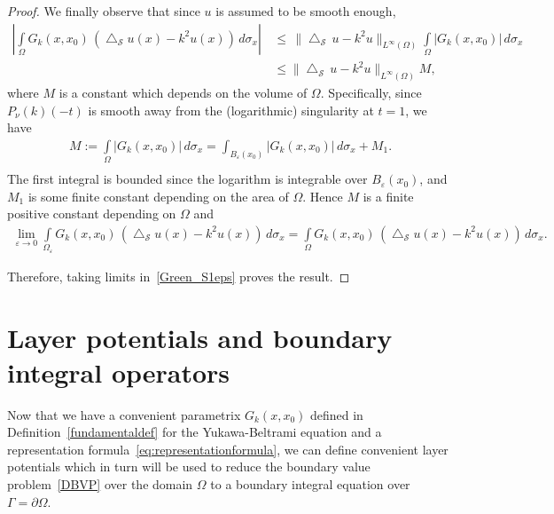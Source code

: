 \documentclass[final]{siamltex}
\newcommand{\lap}{\bigtriangleup}
\renewcommand{\S} {\mathcal{S}}
\begin{document}
\begin{proof}
We finally observe that since $u$ is assumed to be smooth enough,
\begin{align*} 
\left| \int\limits_{\Omega}
G_k(x,x_0)\,(\lap_{\S} u(x)-k^2u(x)) \, d\sigma_x\right|\,&\leq \,
\|\lap_{\S}\,u -k^2 u\|_{L^{\infty}(\Omega)} \int\limits_{\Omega}
|G_k(x,x_0)| \, d\sigma_x\,\\
& \leq \|\lap_{\S}\,u -k^2 u\|_{L^{\infty}(\Omega)}M,
\end{align*}
where $M$ is a constant which depends on the volume of $\Omega$.
Specifically, since $P_\nu(k)(-t)$ is smooth away from the
(logarithmic) singularity at $t=1$, we have 
\begin{align*}
M:=\int\limits_{\Omega} |G_k(x,x_0)| \, d\sigma_x=\int_{B_{\varepsilon}(x_0)}|G_k(x,x_0)| \, d\sigma_x + M_1. \\
\end{align*}
The first integral is bounded since the logarithm is integrable over
${B_{\varepsilon}(x_0)}$, and $M_1$ is some finite constant depending
on the area of $\Omega$. Hence $M$ is a finite positive
constant depending on $\Omega$ and
\begin{align*}
  \lim_{\varepsilon\rightarrow 0}
  \int\limits_{\Omega_{\varepsilon}} G_k(x,x_0)\,(\lap_{\S} u(x)
  -k^2u(x)) \,d\sigma_x = \int\limits_{\Omega} G_k(x,x_0)\,
  (\lap_{\S} u(x) -k^2u(x))\,d\sigma_x.
\end{align*}

Therefore, taking limits in~\eqref{Green_S1eps} proves the result.
\end{proof}

\section{Layer potentials and boundary integral operators}
Now that we have a convenient parametrix $G_k(x,x_0)$ defined in
Definition~\ref{fundamentaldef} for the Yukawa-Beltrami equation and a
representation formula~\eqref{eq:representationformula}, we can define
convenient layer potentials which in turn will be used to reduce the
boundary value problem~\eqref{DBVP}  over the domain $\Omega$ to a
boundary integral equation over $\Gamma = \partial \Omega$.


\end{document}

